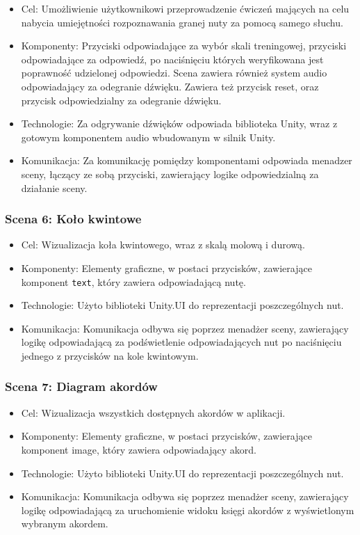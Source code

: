 \begin{itemize}
\item Cel: Umożliwienie użytkownikowi przeprowadzenie ćwiczeń mających na celu nabycia umiejętności rozpoznawania granej nuty za pomocą samego słuchu.
\item Komponenty: Przyciski odpowiadające za wybór skali treningowej, przyciski odpowiadające za odpowiedź, po naciśnięciu których weryfikowana jest poprawność udzielonej odpowiedzi. Scena zawiera również system audio odpowiadający za odegranie dźwięku. Zawiera też przycisk reset, oraz przycisk odpowiedzialny za odegranie dźwięku.
\item Technologie: Za odgrywanie dźwięków odpowiada biblioteka Unity, wraz z gotowym komponentem audio wbudowanym w silnik Unity.
\item Komunikacja: Za komunikację pomiędzy komponentami odpowiada menadzer sceny, łączący ze sobą przyciski, zawierający logike odpowiedzialną za działanie sceny.
\end{itemize}

\subsubsection{Scena 6: Koło kwintowe}

\begin{itemize}
	\item Cel: Wizualizacja koła kwintowego, wraz z skalą molową i durową.
	\item Komponenty: Elementy graficzne, w postaci przycisków, zawierające komponent \texttt{text}, który zawiera odpowiadającą nutę.
	\item Technologie: Użyto biblioteki Unity.UI do reprezentacji poszczególnych nut.
	\item Komunikacja: Komunikacja odbywa się poprzez menadżer sceny, zawierający logikę odpowiadającą za podświetlenie odpowiadających nut po naciśnięciu jednego z przycisków na kole kwintowym.
\end{itemize}

\subsubsection{Scena 7: Diagram akordów}

\begin{itemize}
	\item Cel: Wizualizacja wszystkich dostępnych akordów w aplikacji.
	\item Komponenty: Elementy graficzne, w postaci przycisków, zawierające komponent image, który zawiera odpowiadający akord.
	\item Technologie: Użyto biblioteki Unity.UI do reprezentacji poszczególnych nut.
	\item Komunikacja: Komunikacja odbywa się poprzez menadżer sceny, zawierający logikę odpowiadającą za uruchomienie widoku księgi akordów z wyświetlonym wybranym akordem.
\end{itemize}

